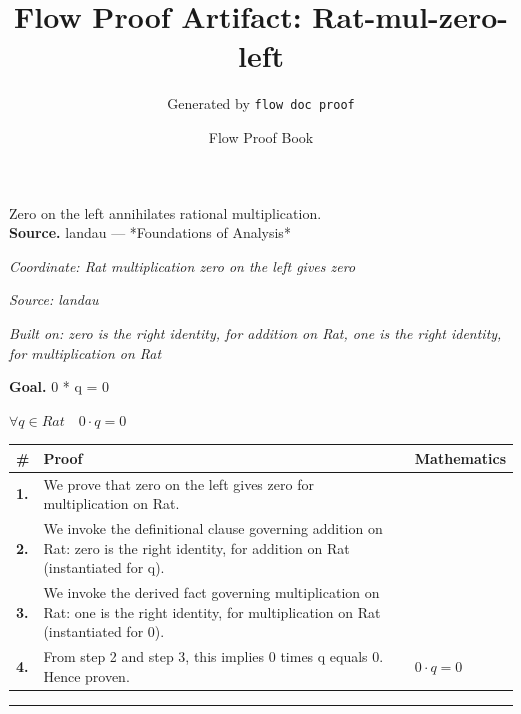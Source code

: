 \documentclass[11pt]{article}
\title{Flow Proof Artifact: Rat-mul-zero-left}
\author{Generated by \texttt{flow doc proof}}
\date{Flow Proof Book}
\theoremstyle{definition}
\begin{document}
\maketitle
Zero on the left annihilates rational multiplication.\\[0.5em]
\textbf{Source.} landau — *Foundations of Analysis*\\[0.5em]
\bigskip
{}\par
\smallskip\noindent\textit{Coordinate: Rat \cdot multiplication \cdot zero on the left gives zero}\par
\smallskip\noindent\textit{Source: landau}\par
\smallskip\noindent\textit{Built on: zero is the right identity, for addition on Rat, one is the right identity, for multiplication on Rat}\par
\medskip
\noindent\textbf{Goal.} 0 * q = 0\par
\noindent$\displaystyle \forall q \in Rat\quad 0 \cdot q = 0$\par
\medskip
\noindent
\begin{tabular}{@{} >{\raggedright\arraybackslash}p{} >{\raggedright\arraybackslash}p{} >{\raggedleft\arraybackslash}p{} @{}}
\textbf{\#} & \textbf{Proof} & \textbf{Mathematics} \\
\midrule
\textbf{1.} & We prove that zero on the left gives zero for multiplication on Rat. & \\[0.45em]
\textbf{2.} & We invoke the definitional clause governing addition on Rat: zero is the right identity, for addition on Rat (instantiated for q). & \\[0.45em]
\textbf{3.} & We invoke the derived fact governing multiplication on Rat: one is the right identity, for multiplication on Rat (instantiated for 0). & \\[0.45em]
\textbf{4.} & From step 2 and step 3, this implies 0 times q equals 0. Hence proven. & $\displaystyle 0 \cdot q = 0$ \\[0.45em]
\bottomrule
\end{tabular}
\label{thm:Rat-multiplication-zero_on_the_left_gives_zero}
\par\medskip\hrule
\end{document}
